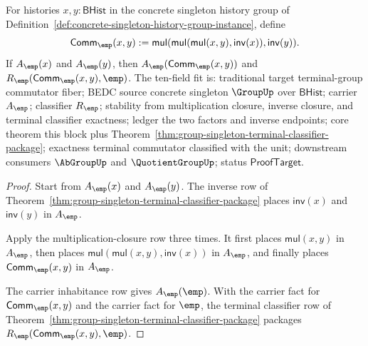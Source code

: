 \begin{theorem}
\label{thm:group-singleton-commutator-terminal-collapse}
For histories $x,y:\mathsf{BHist}$ in the concrete singleton history group of
Definition~\ref{def:concrete-singleton-history-group-instance}, define
$$
\mathsf{Comm}_{\emp}(x,y):=
\mathsf{mul}(\mathsf{mul}(\mathsf{mul}(x,y),\mathsf{inv}(x)),\mathsf{inv}(y)).
$$
If $A_{\emp}(x)$ and $A_{\emp}(y)$, then
$A_{\emp}(\mathsf{Comm}_{\emp}(x,y))$ and
$R_{\emp}(\mathsf{Comm}_{\emp}(x,y),\emp)$.
The ten-field fit is: traditional target terminal-group commutator fiber; BEDC
source concrete singleton $\GroupUp$ over $\mathsf{BHist}$; carrier
$A_{\emp}$; classifier $R_{\emp}$; stability from multiplication closure,
inverse closure, and terminal classifier exactness; ledger the two factors and
inverse endpoints; core theorem this block plus
Theorem~\ref{thm:group-singleton-terminal-classifier-package}; exactness
terminal commutator classified with the unit; downstream consumers
$\AbGroupUp$ and $\QuotientGroupUp$; status $\mathsf{ProofTarget}$.
\end{theorem}
\begin{proof}
Start from $A_{\emp}(x)$ and $A_{\emp}(y)$. The inverse row of
Theorem~\ref{thm:group-singleton-terminal-classifier-package} places
$\mathsf{inv}(x)$ and $\mathsf{inv}(y)$ in $A_{\emp}$.

Apply the multiplication-closure row three times. It first places
$\mathsf{mul}(x,y)$ in $A_{\emp}$, then places
$\mathsf{mul}(\mathsf{mul}(x,y),\mathsf{inv}(x))$ in $A_{\emp}$, and finally
places $\mathsf{Comm}_{\emp}(x,y)$ in $A_{\emp}$.

The carrier inhabitance row gives $A_{\emp}(\emp)$. With the carrier fact for
$\mathsf{Comm}_{\emp}(x,y)$ and the carrier fact for $\emp$, the terminal
classifier row of Theorem~\ref{thm:group-singleton-terminal-classifier-package}
packages $R_{\emp}(\mathsf{Comm}_{\emp}(x,y),\emp)$.
\end{proof}

